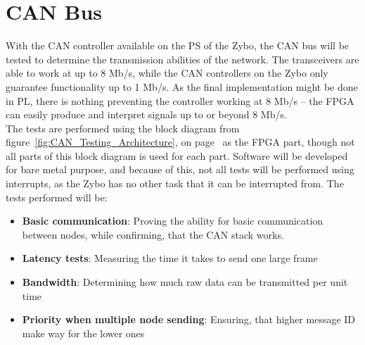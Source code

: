 
\section{CAN Bus}
\label{sub:CAN_Bus_Tests}
With the CAN controller available on the PS of the Zybo, the CAN bus will be tested to determine the transmission abilities of the network.
The transceivers are able to work at up to 8 Mb/s, while the CAN controllers on the Zybo only guarantee functionality up to 1 Mb/s. 
As the final implementation might be done in PL, there is nothing preventing the controller working at 8 Mb/s -- the FPGA can easily produce and interpret signals up to or beyond 8 Mb/s.\\

The tests are performed using the block diagram from figure~\ref{fig:CAN_Testing_Architecture}, on page~\pageref{fig:CAN_Testing_Architecture} as the FPGA part, though not all parts of this block diagram is used for each part.
Software will be developed for bare metal purpose, and because of this, not all tests will be performed using interrupts, as the Zybo has no other task that it can be interrupted from.
The tests performed will be: 
\begin{itemize}
	\item \textbf{Basic communication}: Proving the ability for basic communication between nodes, while confirming, that the CAN stack works.
	\item \textbf{Latency tests}: Measuring the time it takes to send one large frame
	\item \textbf{Bandwidth}: Determining how much raw data can be transmitted per unit time
	\item \textbf{Priority when multiple node sending}: Ensuring, that higher message ID make way for the lower ones 
\end{itemize}

